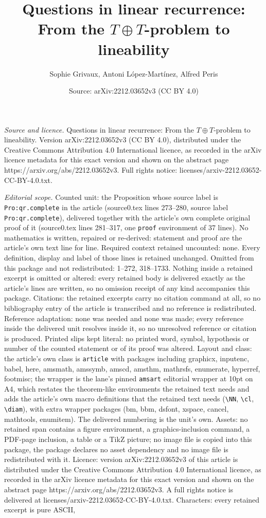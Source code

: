 \documentclass[10pt,a4paper]{amsart}
\title[Questions in linear recurrence: From the $T\oplus T$-problem]{Questions in linear recurrence: From the $T\oplus T$-problem to lineability}
\author{Sophie Grivaux, Antoni L\'opez-Mart\'inez, Alfred Peris}
\date{Source: arXiv:2212.03652v3 (CC BY 4.0)}
\begin{document}
\maketitle

\noindent\emph{Source and licence.} Questions in linear recurrence: From the $T\oplus T$-problem to lineability. Version arXiv:2212.03652v3 (CC BY 4.0), distributed under the Creative Commons Attribution 4.0 International licence, as recorded in the arXiv licence metadata for this exact version and shown on the abstract page https://arxiv.org/abs/2212.03652v3. Full rights notice: licenses/arxiv-2212.03652-CC-BY-4.0.txt.\par\smallskip

\noindent\textit{Editorial scope.} Counted unit: the Proposition whose source label is \texttt{Pro:qr.complete} in the article (source0.tex lines 273--280, source label \texttt{Pro:qr.complete}), delivered together with the article's own complete original proof of it (source0.tex lines 281--317, one \texttt{proof} environment of 37 lines). No mathematics is written, repaired or re-derived: statement and proof are the article's own text line for line. Required context retained uncounted: none. Every definition, display and label of those lines is retained unchanged. Omitted from this package and not redistributed: 1--272, 318--1733. Nothing inside a retained excerpt is omitted or altered: every retained body is delivered exactly as the article's lines are written, so no omission receipt of any kind accompanies this package. Citations: the retained excerpts carry no citation command at all, so no bibliography entry of the article is transcribed and no reference is redistributed. Reference adaptation: none was needed and none was made; every reference inside the delivered unit resolves inside it, so no unresolved reference or citation is produced. Printed slips kept literal: no printed word, symbol, hypothesis or number of the counted statement or of its proof was altered. Layout and class: the article's own class is \texttt{article} with packages including graphicx, inputenc, babel, here, amsmath, amssymb, amscd, amsthm, mathrsfs, enumerate, hyperref, footmisc; the wrapper is the lane's pinned \texttt{amsart} editorial wrapper at 10pt on A4, which restates the theorem-like environments the retained text needs and adds the article's own macro definitions that the retained text needs (\texttt{\textbackslash NN}, \texttt{\textbackslash cl}, \texttt{\textbackslash diam}), with extra wrapper packages (bm, bbm, dsfont, xspace, cancel, mathtools, enumitem). The delivered numbering is the unit's own. Assets: no retained span contains a figure environment, a graphics-inclusion command, a PDF-page inclusion, a table or a TikZ picture; no image file is copied into this package, the package declares no asset dependency and no image file is redistributed with it. Licence: version arXiv:2212.03652v3 of this article is distributed under the Creative Commons Attribution 4.0 International licence, as recorded in the arXiv licence metadata for this exact version and shown on the abstract page https://arxiv.org/abs/2212.03652v3. A full rights notice is delivered at licenses/arxiv-2212.03652-CC-BY-4.0.txt. Characters: every retained excerpt is pure ASCII, 
\end{document}
